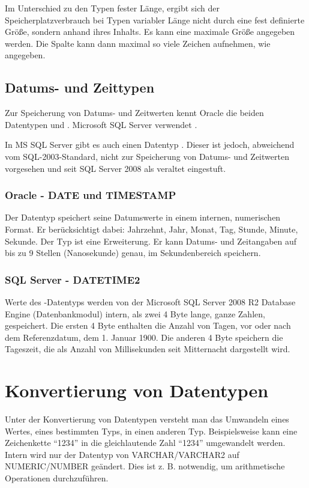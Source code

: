           \begin{merke}
            Im Unterschied zu den Typen fester Länge, ergibt sich der Speicherplatzverbrauch bei Typen variabler Länge nicht durch eine fest definierte Größe, sondern anhand ihres Inhalts. Es kann eine maximale Größe angegeben werden. Die Spalte kann dann maximal so viele Zeichen aufnehmen, wie angegeben.
          \end{merke}
        \subsection{Datums- und Zeittypen}
          Zur Speicherung von Datums- und Zeitwerten kennt Oracle die beiden Datentypen  und . Microsoft SQL Server verwendet .

          \begin{merke}
            In MS SQL Server gibt es auch einen Datentyp . Dieser ist jedoch, abweichend vom SQL-2003-Standard, nicht zur Speicherung von Datums- und Zeitwerten vorgesehen und seit SQL Server 2008 als veraltet eingestuft.
          \end{merke}
          \subsubsection{Oracle - DATE und TIMESTAMP}
            Der Datentyp  speichert seine Datumswerte in einem internen, numerischen Format. Er berücksichtigt dabei: Jahrzehnt, Jahr, Monat, Tag, Stunde, Minute, Sekunde. Der Typ  ist eine Erweiterung. Er kann Datums- und Zeitangaben auf bis zu 9 Stellen (Nanosekunde) genau, im Sekundenbereich speichern.
          \subsubsection{SQL Server - DATETIME2}
            Werte des -Datentyps werden von der Microsoft SQL Server 2008 R2 Database Engine (Datenbankmodul) intern, als zwei 4 Byte lange, ganze Zahlen, gespeichert. Die ersten 4 Byte enthalten die Anzahl von Tagen, vor oder nach dem Referenzdatum, dem 1. Januar 1900. Die anderen 4 Byte speichern die Tageszeit, die als Anzahl von Millisekunden seit Mitternacht dargestellt wird.
    \section{Konvertierung von Datentypen}
      Unter der Konvertierung von Datentypen versteht man das Umwandeln eines Wertes, eines bestimmten Typs, in einen anderen Typ. Beispielsweise kann eine Zeichenkette \enquote{1234} in die gleichlautende Zahl \enquote{1234} umgewandelt werden. Intern wird nur der Datentyp von VARCHAR/VARCHAR2 auf NUMERIC/NUMBER geändert. Dies ist z. B. notwendig, um arithmetische Operationen durchzuführen.
